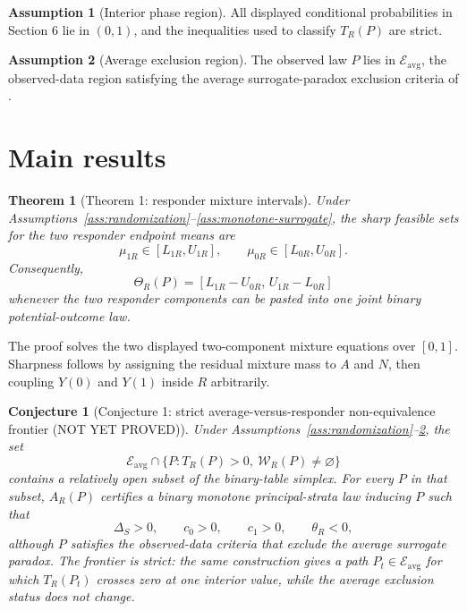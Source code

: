 \documentclass[11pt]{article}
\theoremstyle{definition}
\newtheorem{assumption}{Assumption}
\theoremstyle{plain}
\newtheorem{theorem}{Theorem}
\newtheorem{conjecture}{Conjecture}
\theoremstyle{remark}
\begin{document}
\begin{assumption}[Interior phase region]\label{ass:interior-phase}
All displayed conditional probabilities in Section 6 lie in \((0,1)\), and the inequalities used to classify \(T_R(P)\) are strict.
\end{assumption}

\begin{assumption}[Average exclusion region]\label{ass:average-exclusion}
The observed law \(P\) lies in \(\mathcal E_{\mathrm{avg}}\), the observed-data region satisfying the average surrogate-paradox exclusion criteria of \citet[Sec.~3, Theorems~1--2]{YinLiuGengLuo2019}.
\end{assumption}

\section{Main results}
\begin{theorem}[Theorem 1: responder mixture intervals]\label{thm:mixture-intervals}
Under Assumptions~\ref{ass:randomization}--\ref{ass:monotone-surrogate}, the sharp feasible sets for the two responder endpoint means are
\[
  \mu_{1R}\in [L_{1R},U_{1R}],\qquad
  \mu_{0R}\in [L_{0R},U_{0R}].
\]
Consequently,
\[
  \Theta_R(P)=[L_{1R}-U_{0R},\, U_{1R}-L_{0R}]
\]
whenever the two responder components can be pasted into one joint binary potential-outcome law.
\end{theorem}
The proof solves the two displayed two-component mixture equations over \([0,1]\). Sharpness follows by assigning the residual mixture mass to \(A\) and \(N\), then coupling \(Y(0)\) and \(Y(1)\) inside \(R\) arbitrarily.

\begin{conjecture}[Conjecture 1: strict average-versus-responder non-equivalence frontier (NOT YET PROVED)]\label{conj:phase-frontier}
Under Assumptions~\ref{ass:randomization}--\ref{ass:average-exclusion}, the set
\[
  \mathcal E_{\mathrm{avg}}\cap\{P:T_R(P)>0,\ \mathcal W_R(P)\ne\varnothing\}
\]
contains a relatively open subset of the binary-table simplex. For every \(P\) in that subset, \(A_R(P)\) certifies a binary monotone principal-strata law inducing \(P\) such that
\[
  \Delta_S>0,\qquad c_0>0,\qquad c_1>0,\qquad \theta_R<0,
\]
although \(P\) satisfies the observed-data criteria that exclude the average surrogate paradox. The frontier is strict: the same construction gives a path \(P_t\in\mathcal E_{\mathrm{avg}}\) for which \(T_R(P_t)\) crosses zero at one interior value, while the average exclusion status does not change.
\end{conjecture}
\end{document}
